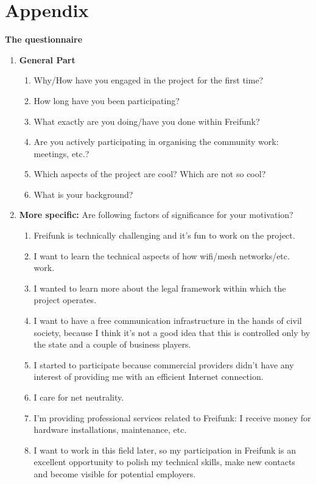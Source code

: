 \section{Appendix}

\textbf{The questionnaire}

\begin{enumerate}[label*=\arabic*.]
  \item \textbf{General Part}
 \begin{enumerate}[label*=\arabic*.]
   \item Why/How have you engaged in the project for the first time?
   \item How long have you been participating?
   \item What exactly are you doing/have you done within Freifunk?
   \item Are you actively participating in organising the community work: meetings, etc.?
   \item Which aspects of the project are cool? Which are not so cool?
   \item What is your background?
 \end{enumerate}

\item \textbf{More specific:} Are following factors of significance for your motivation?
\begin{enumerate}[label*=\arabic*.]
  \item Freifunk is technically challenging and it's fun to work on the project.
  \item I want to learn the technical aspects of how wifi/mesh networks/etc. work.
  \item I wanted to learn more about the legal framework within which the project operates.
  \item I want to have a free communication infrastructure in the hands of civil society, because I think it's not a good idea that this is controlled only by the state and a couple of business players.
  \item I started to participate because commercial providers didn't have any interest of providing me with an efficient Internet connection.
  \item I care for net neutrality.
  \item I'm providing professional services related to Freifunk: I receive money for hardware installations, maintenance, etc.
  \item I want to work in this field later, so my participation in Freifunk is an excellent opportunity to polish my technical skills, make new contacts and become visible for potential employers.
\end{enumerate}

\end{enumerate}


